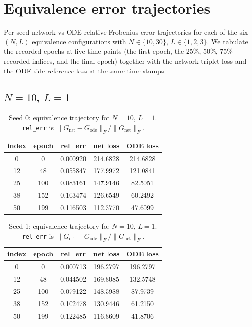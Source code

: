 \section{Equivalence error trajectories}
\label{app:equiv-traj}

Per-seed network-vs-ODE relative Frobenius error trajectories for each of the six $(N, L)$ equivalence configurations with $N \in \{10, 30\}$, $L \in \{1, 2, 3\}$. We tabulate the recorded epochs at five time-points (the first epoch, the 25\%, 50\%, 75\% recorded indices, and the final epoch) together with the network triplet loss and the ODE-side reference loss at the same time-stamps.

\subsection{$N=10$, $L=1$}
\begin{table}[H]
\centering
\caption{Seed 0: equivalence trajectory for $N=10$, $L=1$. \texttt{rel\_err} is $\|G_{\mathrm{net}} - G_{\mathrm{ode}}\|_F / \|G_{\mathrm{net}}\|_F$.}
\label{tab:equiv-N10-L1-s0}
\begin{tabular}{c c c c c}
\toprule
index & epoch & rel\_err & net loss & ODE loss \\
\midrule
0 & 0 & 0.000920 & 214.6828 & 214.6828 \\
12 & 48 & 0.055847 & 177.9972 & 121.0841 \\
25 & 100 & 0.083161 & 147.9146 & 82.5051 \\
38 & 152 & 0.103474 & 126.6549 & 60.2492 \\
50 & 199 & 0.116503 & 112.3770 & 47.6099 \\
\bottomrule
\end{tabular}
\end{table}

\begin{table}[H]
\centering
\caption{Seed 1: equivalence trajectory for $N=10$, $L=1$. \texttt{rel\_err} is $\|G_{\mathrm{net}} - G_{\mathrm{ode}}\|_F / \|G_{\mathrm{net}}\|_F$.}
\label{tab:equiv-N10-L1-s1}
\begin{tabular}{c c c c c}
\toprule
index & epoch & rel\_err & net loss & ODE loss \\
\midrule
0 & 0 & 0.000713 & 196.2797 & 196.2797 \\
12 & 48 & 0.044502 & 169.8085 & 132.5748 \\
25 & 100 & 0.079122 & 148.3988 & 87.9739 \\
38 & 152 & 0.102478 & 130.9446 & 61.2150 \\
50 & 199 & 0.122485 & 116.8609 & 41.8706 \\
\bottomrule
\end{tabular}
\end{table}

